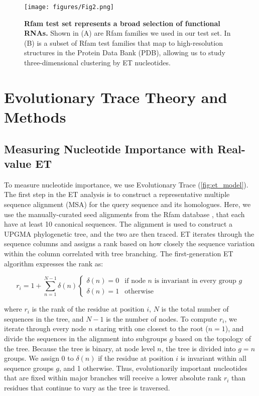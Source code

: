 \documentclass[12pt,a4paper]{report}
\begin{document}
\begin{figure}
\begin{minipage}[c][\textheight]{\textwidth}
\vspace*{-0.5in}
\centering
  \texttt{[image: figures/Fig2.png]} %
  \caption[Rfam test set represents a broad selection of functional RNAs.]{\textbf{Rfam test set represents a broad selection of functional RNAs.}  Shown in (A) are Rfam families we used in our test set. In (B) is a subset of Rfam test families that map to high-resolution structures in the Protein Data Bank (PDB), allowing us to study three-dimensional clustering by ET nucleotides.}
  \label{fig:rfam_pie}
  \end{minipage}
\end{figure}


\section{Evolutionary Trace Theory and Methods}
\subsection{Measuring Nucleotide Importance with Real-value ET}
To measure nucleotide importance, we use Evolutionary Trace (\ref{fig:et_model}). The first step in the ET analysis is to construct a representative multiple sequence alignment (MSA) for the query sequence and its homologues. Here, we use the manually-curated seed alignments from the Rfam database \cite{Kalvari2018}, that each have at least 10 canonical sequences. The alignment is used to construct a UPGMA phylogenetic tree, and the two are then traced. ET iterates through the sequence columns and assigns a rank based on how closely the sequence variation within the column correlated with tree branching. The first-generation ET algorithm \cite{Lichtarge1996, Lichtarge2003} expresses the rank as:

\begin{equation*} \label{eq:integer_et_equation}
r_i = 1+\sum_{n=1}^{N-1} \delta(n) \begin{cases}
\delta(n) = 0 &\text{if node $n$ is invariant in every group $g$}\\
\delta(n) = 1 &\text{otherwise}
\end{cases}
\tag{1}
\end{equation*}

where $r_i$ is the rank of the residue at position $i$, $N$ is the total number of sequences in the tree, and $N-1$ is the number of nodes. To compute $r_i$, we iterate through every node $n$ staring with one closest to the root ($n=1$), and divide the sequences in the alignment into subgroups $g$ based on the topology of the tree. Because the tree is binary, at node level $n$, the tree is divided into $g=n$ groups. We assign 0 to $\delta(n)$ if the residue at position $i$ is invariant within all sequence groups $g$, and 1 otherwise. Thus, evolutionarily important nucleotides that are fixed within major branches will receive a lower absolute rank $r_i$ than residues that continue to vary as the tree is traversed.
\end{document}
